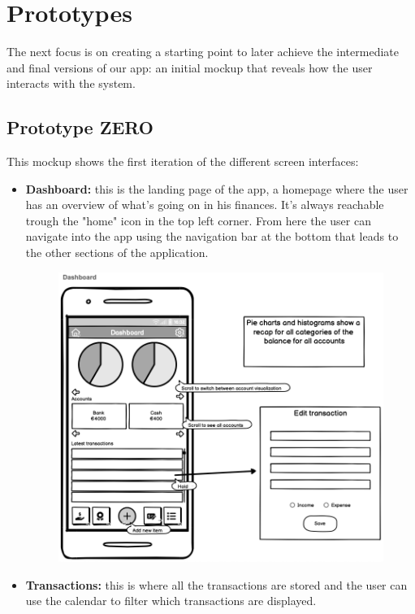 \documentclass[a4paper,12pt]{article}
\begin{document}
\section{Prototypes}
The next focus is on creating a starting point to later achieve the intermediate and final versions of our app: an initial mockup that reveals how the user interacts with the system.
\subsection{Prototype ZERO}
This mockup shows the first iteration of the different screen interfaces:
\begin{itemize}
    \item \textbf{Dashboard:} this is the landing page of the app, a homepage where the user has an overview of what's going on in his finances. It's always reachable trough the "home" icon in the top left corner. From here the user can navigate into the app using the navigation bar at the bottom that leads to the other sections of the application.
    \begin{figure}[H]
        \centering
        \includegraphics[scale = 0.4]{dashmock.png}
    \end{figure}
    \item \textbf{Transactions:} this is where all the transactions are stored and the user can use the calendar to filter which transactions are displayed.
    \begin{figure}[H]

\end{figure}
\end{itemize}
\end{document}
